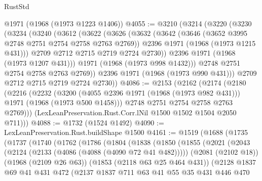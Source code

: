 \begin{lexlean}{RustStd}
\begin{coremodule}
    @1971
    (@1968 (@1973 @1223 @1406))
@4055 := @3210
    (@3214
      (@3220
        (@3230
          (@3234
            (@3240
              (@3612
                (@3622
                  (@3626
                    (@3632
                      (@3642
                        (@3646 (@3652 @3995 @2748 @2751 @2754 @2758 @2763 @2769))
                        @2396
                        @1971
                        (@1968 (@1973 @1215 @431)))
                      @2709
                      @2712
                      @2715
                      @2719
                      @2724
                      @2730))
                  @2396
                  @1971
                  (@1968 (@1973 @1207 @431)))
                @1971
                (@1968 (@1973 @998 @1432)))
              @2748
              @2751
              @2754
              @2758
              @2763
              @2769))
          @2396
          @1971
          (@1968 (@1973 @990 @431)))
        @2709
        @2712
        @2715
        @2719
        @2724
        @2730))
@4086 := @2153
    (@2162
      (@2174
        (@2180
          (@2216
            (@2232
              (@3200 (@4055 @2396 @1971 (@1968 (@1973 @982 @431))) @1971 (@1968 (@1973 @500 @1458)))
              @2748
              @2751
              @2754
              @2758
              @2763
              @2769)))
        (LexLeanPreservation.Rust.Corr.lNil @1500 @1502 @1504 @2050 @711)))
@4088 := @1732 (@1524 @1492)
@4090 := LexLeanPreservation.Rust.buildShape @1500
@4161 := @1519
    (@1688
      (@1735
        (@1737
          (@1740
            (@1762
              (@1786
                (@1804
                  (@1838
                    (@1850
                      (@1855
                        (@2021
                          (@2043
                            (@2124 (@2133 (@4086 (@4088 (@4090 @72 @41 @482)))))
                            (@2081 (@2102 @18))
                            (@1968 (@2109 @26 @63))
                            (@1853 (@2118 @63 @25 @464 @431))
                            (@2128
                              @1837
                              @69
                              @41
                              @431
                              @472
                              (@2137
                                @1837
                                @711
                                @63
                                @41
                                @55
                                @35
                                @431
                                @446
                                @470

\end{coremodule}
\end{lexlean}
